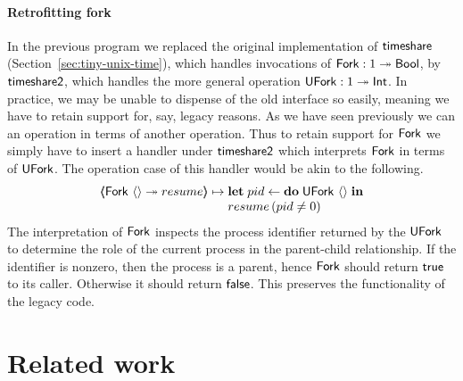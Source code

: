 \documentclass[12pt,phd,lfcs,twoside,openright,logo,leftchapter,normalheadings]{infthesis}
\theoremstyle{plain}
\theoremstyle{definition}
\begin{document}
\paragraph{Retrofitting fork} In the previous program we replaced the
original implementation of $\mathsf{timeshare}$
(Section~\ref{sec:tiny-unix-time}), which handles invocations of
$\mathsf{Fork} : 1 \twoheadrightarrow \mathsf{Bool}$, by $\mathsf{timeshare2}$, which handles the
more general operation $\mathsf{UFork} : 1 \twoheadrightarrow \mathsf{Int}$. In practice,
we may be unable to dispense of the old interface so easily, meaning
we have to retain support for, say, legacy reasons. As we have seen
previously we can an operation in terms of another operation. Thus to
retain support for $\mathsf{Fork}$ we simply have to insert a handler under
$\mathsf{timeshare2}$ which interprets $\mathsf{Fork}$ in terms of $\mathsf{UFork}$. The
operation case of this handler would be akin to the following.
%
\[
  \OpCase{\Fork}{\Unit}{resume} \mapsto
    \bl
      \Let\;pid \revto \Do\;\UFork~\Unit\;\In\\
      resume\,(pid \neq 0)
    \el
\]
%
The interpretation of $\mathsf{Fork}$ inspects the process identifier returned
by the $\mathsf{UFork}$ to determine the role of the current process in the
parent-child relationship. If the identifier is nonzero, then the
process is a parent, hence $\mathsf{Fork}$ should return $\mathsf{true}$ to its
caller. Otherwise it should return $\mathsf{false}$. This preserves the
functionality of the legacy code.

\section{Related work}
\label{sec:unix-related-work}
\end{document}
